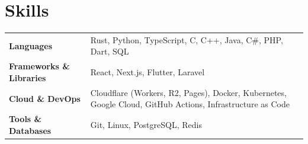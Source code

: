 \documentclass[a4paper,11pt]{article}
\begin{document}
\section{Skills}
\begin{tabularx}{\linewidth}{@{}l X@{}}
\textbf{Languages} & \normalsize{Rust, Python, TypeScript, C, C++, Java, C\#, PHP, Dart, SQL} \\
\textbf{Frameworks \& Libraries} & \normalsize{React, Next.js, Flutter, Laravel} \\
\textbf{Cloud \& DevOps} & \normalsize{Cloudflare (Workers, R2, Pages), Docker, Kubernetes, Google Cloud, GitHub Actions, Infrastructure as Code} \\
\textbf{Tools \& Databases} & \normalsize{Git, Linux, PostgreSQL, Redis} \\
\end{tabularx}

\end{document}
